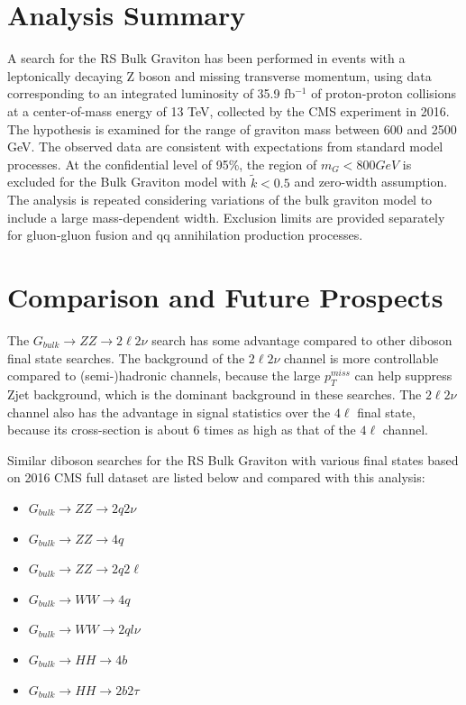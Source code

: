 \section{Analysis Summary}
A search for the RS Bulk Graviton has been performed in events with a leptonically decaying Z boson and missing transverse momentum, using data corresponding to an integrated luminosity of 35.9 fb$^{-1}$ of proton-proton collisions at a center-of-mass energy of 13 TeV, collected by the CMS experiment in 2016. The hypothesis is examined for the range of graviton mass between 600 and 2500 GeV. The observed data are consistent with expectations from standard model processes. At the confidential level of 95\%, the region of $m_G <800 GeV$ is excluded for the Bulk Graviton model with $\tilde{k}<0.5$ and zero-width assumption. The analysis is repeated considering variations of the bulk graviton model to include a large mass-dependent width. Exclusion limits are provided separately for gluon-gluon fusion and qq annihilation production processes.

\section{Comparison and Future Prospects}
The $G_{bulk}\rightarrow ZZ\rightarrow 2\ell 2\nu$ search has some advantage compared to other diboson final state searches. The background of the $2\ell2\nu$ channel is more controllable compared to (semi-)hadronic channels, because the large $p_T ^{miss}$ can help suppress Zjet background, which is the dominant background in these searches. The $2\ell2\nu$ channel also has the advantage in signal statistics over the $4\ell$ final state, because its cross-section is about 6 times as high as that of the $4\ell$ channel.

\vspace{0.3cm}
Similar diboson searches for the RS Bulk Graviton with various final states based on 2016 CMS full dataset are listed below and compared with this analysis:
\begin{itemize}
\item $G_{bulk}\rightarrow ZZ\rightarrow 2q 2\nu$~\cite{sum_zzqqnn}
\item $G_{bulk}\rightarrow ZZ\rightarrow 4q$~\cite{sum_vv4q}
\item $G_{bulk}\rightarrow ZZ\rightarrow 2q 2\ell$~\cite{sum_zzqqll}
\item $G_{bulk}\rightarrow WW\rightarrow 4q$~\cite{sum_vv4q}
\item $G_{bulk}\rightarrow WW\rightarrow 2ql\nu$~\cite{sum_wwqqln}
\item $G_{bulk}\rightarrow HH\rightarrow 4b$~\cite{sum_hh4b}
\item $G_{bulk}\rightarrow HH\rightarrow 2b 2\tau$~\cite{sum_hh2b2t}
\end{itemize}

